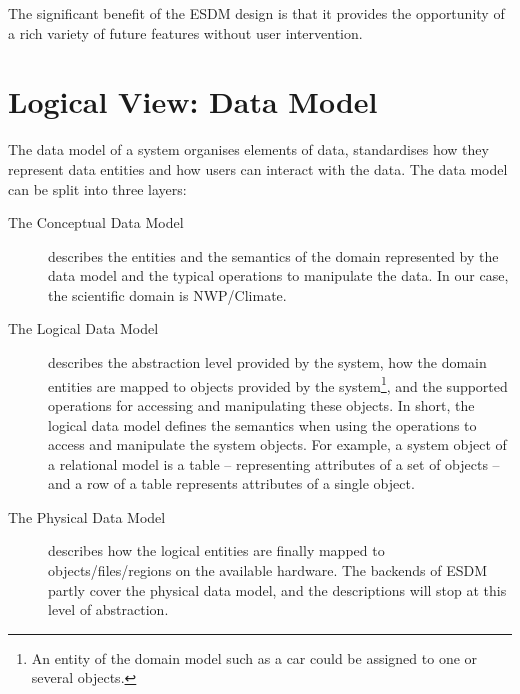 The significant benefit of the ESDM design is that it provides the opportunity of a rich variety of future features without user intervention.

\section{Logical View: Data Model}
\label{sec: viewpoints/logical/data model}

\tab
The data model of a system organises elements of data, standardises how they represent data entities and how users can interact with the data.
The data model can be split into three layers:

\begin{description}

\item[The Conceptual Data Model]

\tab

 describes the entities and the semantics of the domain represented by the data model and the typical operations to manipulate the data.
In our case, the scientific domain is NWP/Climate.

\item[The Logical Data Model]

\tab

 describes the abstraction level provided by the system, how the domain entities are mapped to objects provided by the system\footnote{An entity of the domain model such as a car could be assigned to one or several objects.}, and the supported operations for accessing and manipulating these objects.
In short, the logical data model defines the semantics when using the operations to access and manipulate the system objects.
For example, a system object of a relational model is a table -- representing attributes of a set of objects -- and a row of a table represents attributes of a single object.

\item[The Physical Data Model]

\tab

 describes how the logical entities are finally mapped to objects/files/regions on the available hardware.
The backends of ESDM partly cover the physical data model, and the descriptions will stop at this level of abstraction.

\end{description}

